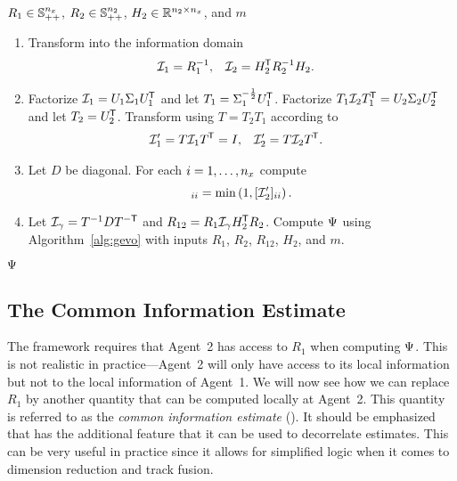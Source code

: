 \begin{algorithm}[t]
	\caption{\GEVOLE}
	\label{alg:gevo-le}
	\begin{small}
	\begin{algorithmic}[0]
		\Require $R_1\in\mathbb{S}_{++}^{n_x}$, $R_2\in\mathbb{S}_{++}^{n_2}$, $H_2\in{\mathbb{R}}^{n_2\times n_x}$, and $m$ \\
		\begin{enumerate}
			\item Transform into the information domain
			\begin{align*}
				\mathcal{I}_1 &= R_1^{-1}, & \mathcal{I}_2 &= H_2^{\mkern-1.5mu\mathsf{T}} R_2^{-1} H_2.
			\end{align*}
			\item Factorize $\mathcal{I}_1=U_1\Sigma_1 U_1^{\mkern-1.5mu\mathsf{T}}$ and let $T_1=\Sigma_1^{-\frac{1}{2}} U_1^{\mkern-1.5mu\mathsf{T}}$. Factorize $T_1\mathcal{I}_2T_1^{\mkern-1.5mu\mathsf{T}}=U_2\Sigma_2U_2^{\mkern-1.5mu\mathsf{T}}$ and let $T_2=U_2^{\mkern-1.5mu\mathsf{T}}$. Transform using $T=T_2T_1$ according to
			\begin{align*}
				\mathcal{I}_1' &= T\mathcal{I}_1T^{\mkern-1.5mu\mathsf{T}} = I, & \mathcal{I}_2' &= T\mathcal{I}_2T^{\mkern-1.5mu\mathsf{T}}.
			\end{align*}
			\item Let $D$ be diagonal. For each $i=1,\dots,n_x$ compute
			\begin{equation*}
				[D]_{ii} = \min\left( 1, [\calI_2']_{ii}  \right).
			\end{equation*}
			\item Let $\mathcal{I}_\gamma = T^{-1} DT^{-\mathsf{T}}$ and $R_{12} = R_1\mathcal{I}_\gamma H_2^{\mkern-1.5mu\mathsf{T}} R_2$. Compute $\Psi$ using Algorithm~\ref{alg:gevo} with inputs $R_1$, $R_2$, $R_{12}$, $H_2$, and $m$.
		\end{enumerate}
		\Ensure $\Psi$
	\end{algorithmic}
	\end{small}
\end{algorithm}



\subsection{The Common Information Estimate}

The \abbrGEVO framework requires that Agent~2 has access to $R_1$ when computing $\Psi$. This is not realistic in practice---Agent~2 will only have access to its local information but not to the local information of Agent~1. We will now see how we can replace $R_1$ by another quantity that can be computed locally at Agent~2. This quantity is referred to as the \emph{common information estimate} (\abbrCIE). It should be emphasized that \abbrCIE has the additional feature that it can be used to decorrelate estimates. This can be very useful in practice since it allows for simplified logic when it comes to dimension reduction and track fusion. 



